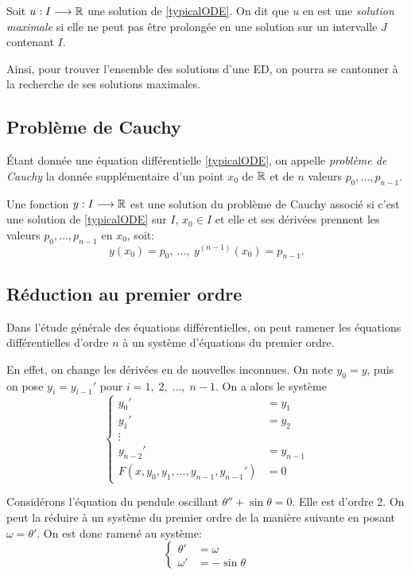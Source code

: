 \documentclass[../main.tex]{subfiles}
\begin{document}
\begin{mydef}
	Soit $u:I\longrightarrow\mathbb R$ une solution de \eqref{typicalODE}. On dit que $u$ en est une \textit{solution maximale} si elle ne peut pas être prolongée en une solution sur un intervalle $J$ contenant $I$.
\end{mydef}

Ainsi, pour trouver l'ensemble des solutions d'une ED, on pourra se cantonner à la recherche de ses solutions maximales.

\subsection{Problème de Cauchy}

\begin{mydef}
	Étant donnée une équation différentielle \eqref{typicalODE}, on appelle \textit{problème de Cauchy} la donnée supplémentaire d'un point $x_0$ de $\mathbb R$ et de $n$ valeurs $p_0,\ldots,p_{n-1}$.

	Une fonction $y:I\longrightarrow\mathbb R$ est une solution du problème de Cauchy associé si c'est une solution de \eqref{typicalODE} sur $I$, $x_0\in I$ et elle et ses dérivées prennent les valeurs $p_0,\ldots,p_{n-1}$ en $x_0$, soit: 
	\[
	y(x_0)=p_0,\ \ldots,\ y^{(n-1)}(x_0) = p_{n-1}.
	\]
\end{mydef}

\subsection{Réduction au premier ordre}

Dans l'étude générale des équations différentielles, on peut ramener les équations différentielles d'ordre $n$ à un système d'équations du premier ordre.

En effet, on change les dérivées en de nouvelles inconnues. On note $y_0=y$, puis on pose $y_i = y_{i-1}'$ pour $i=1,\;2,\;\ldots,\; n-1$. On a alors le système
\begin{equation}
\left\{
	\begin{array}{ll}
		y_0' &= y_1 \\
		y_1' &= y_2 \\
		\vdots & \\
		y_{n-2}' &= y_{n-1}\\
		F(x,y_0,y_1,\ldots,y_{n-1},y_{n-1}') &= 0
	\end{array}
\right.
\end{equation}

\begin{exe}\label{exe:redOrd1}
	Considérons l'équation du pendule oscillant $\theta'' + \sin\theta = 0$. Elle est d'ordre 2. On peut la réduire à un système du premier ordre de la manière suivante en posant $\omega=\theta'$. On est donc ramené au système:
	\begin{equation*}
		\left\lbrace\begin{aligned}
		\theta' &= \omega \\
		\omega' &= -\sin\theta
		\end{aligned}\right.
	\end{equation*}
\end{exe}
\end{document}
